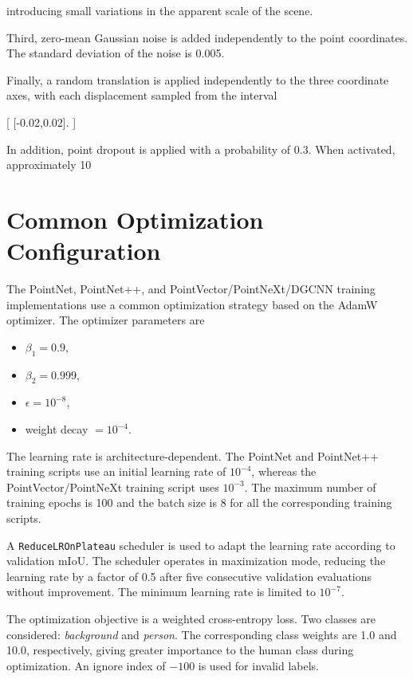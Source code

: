introducing small variations in the apparent scale of the scene.

Third, zero-mean Gaussian noise is added independently to the point coordinates. The standard deviation of the noise is 0.005.

Finally, a random translation is applied independently to the three coordinate axes, with each displacement sampled from the interval

[
[-0.02,0.02].
]

In addition, point dropout is applied with a probability of 0.3. When activated, approximately 10%

\section{Common Optimization Configuration}
\label{app:optimization}

The PointNet, PointNet++, and PointVector/PointNeXt/DGCNN training implementations use a common optimization strategy based on the AdamW optimizer. The optimizer parameters are

\begin{itemize}
\item $\beta_1 = 0.9$,
\item $\beta_2 = 0.999$,
\item $\epsilon = 10^{-8}$,
\item weight decay $=10^{-4}$.
\end{itemize}

The learning rate is architecture-dependent. The PointNet and PointNet++ training scripts use an initial learning rate of $10^{-4}$, whereas the PointVector/PointNeXt training script uses $10^{-3}$. The maximum number of training epochs is 100 and the batch size is 8 for all the corresponding training scripts.

A \texttt{ReduceLROnPlateau} scheduler is used to adapt the learning rate according to validation mIoU. The scheduler operates in maximization mode, reducing the learning rate by a factor of 0.5 after five consecutive validation evaluations without improvement. The minimum learning rate is limited to $10^{-7}$.

The optimization objective is a weighted cross-entropy loss. Two classes are considered: \textit{background} and \textit{person}. The corresponding class weights are 1.0 and 10.0, respectively, giving greater importance to the human class during optimization. An ignore index of $-100$ is used for invalid labels.

